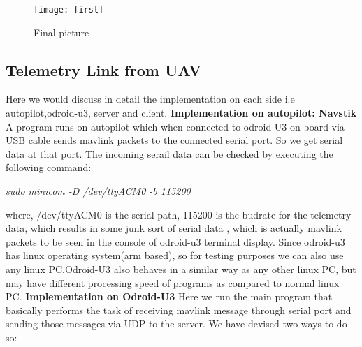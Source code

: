 \documentclass[12pt]{article}
\begin{document}
\begin{figure}[ht!]
\centering
\texttt{[image: first]}
\caption{Final picture}
\label{overflow}
\end{figure}
\newpage

\subsection{Telemetry Link from UAV}
Here we would discuss in detail the implementation on each side i.e autopilot,odroid-u3, server and client.\newline
\newline
{\bf Implementation on autopilot: Navstik}\newline
A program runs on autopilot which when connected to odroid-U3 on board via USB cable
sends mavlink packets to the connected serial port. So we get serial data at that port. The incoming serail data can be checked by executing the following command:\newline
\begin{center}
\textit{sudo minicom -D /dev/ttyACM0 -b 115200}
\end{center}
where, /dev/ttyACM0 is the serial path, 115200 is the budrate for the telemetry data,
\newline
which results in some junk sort of serial data , which is actually mavlink packets to be seen in the console of odroid-u3 terminal display.\newline
Since odroid-u3 has linux operating system(arm based), so for testing purposes we can also use any linux PC.Odroid-U3 also behaves in a similar way as any other linux PC, but may have different processing speed of programs as compared to normal linux PC.\newline\newline
{\bf Implementation on Odroid-U3}\newline\newline
Here we run the main program that basically performs the task of receiving mavlink message through serial port and sending those messages via UDP to the server.\newline
We have devised two ways to do so:
\end{document}
